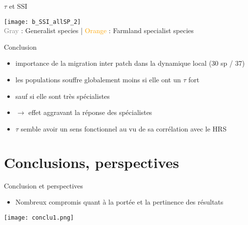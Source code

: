 \documentclass[]{beamer}
\begin{document}
 
  \begin{frame}{$\tau$ et SSI}
  
    
   \begin{center}
                \texttt{[image: b\_SSI\_allSP\_2]}\\
                 \textcolor{gray}{Gray} : Generalist species |  \textcolor{orange}{Orange} : Farmland specialist species
   
    
   \end{center}


 \end{frame} 
 


 
 

\begin{frame}{Conclusion}
  \begin{itemize}[<+->]
   \item importance de la migration inter patch dans la dynamique local (30 sp / 37)
   \item les populations souffre globalement moins si elle ont un $\tau$ fort
   \item sauf si elle sont très spécialistes
   \item $\rightarrow$ effet aggravant la réponse des spécialistes
   \item $\tau$ semble avoir un sens fonctionnel au vu de sa corrélation avec le HRS
  \end{itemize}
 \end{frame}


 
 
 
\section{Conclusions, perspectives}

\begin{frame}{Conclusion et perspectives}
\begin{itemize}
\item Nombreux compromis quant à la portée et la pertinence des résultats\\
\end{itemize}
\begin{center}
 \texttt{[image: conclu1.png]}
\end{center}
\end{frame}
\end{document}
